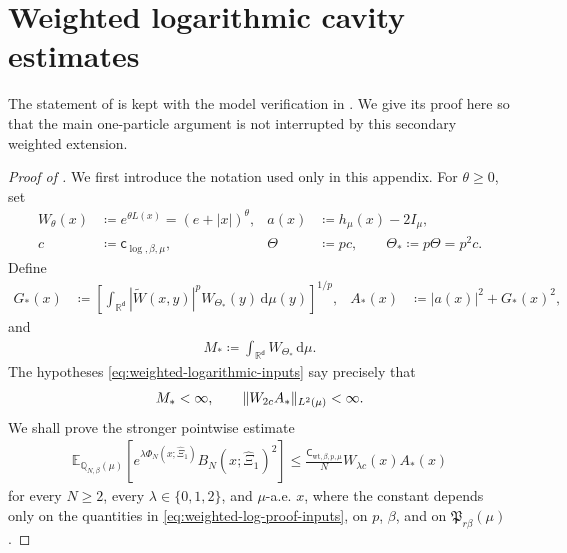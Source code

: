 \documentclass[11pt,reqno]{amsart}
\numberwithin{equation}{section}
\theoremstyle{plain}
\theoremstyle{remark}
\DeclarePairedDelimiter{\norm}{\lVert}{\rVert}
\renewcommand{\d}{\mathsf{d}}
\newcommand{\md}{\mathrm{d}}
\newcommand{\R}{{\mathbb{R}}}
\newcommand{\E}{{\mathbb{E}}}
\newcommand{\Q}{{\mathbb{Q}}}
\newcommand{\tl}{\widetilde}
\newcommand{\be}{\beta}
\begin{document}
\appendix
{}

\section{Weighted logarithmic cavity estimates}
\label{app:weighted-log-cavity}

The statement of  is kept with the model verification in .  We give its proof here so that the main one-particle argument is not interrupted by this secondary weighted extension.

\begin{proof}[Proof of ]
We first introduce the notation used only in this appendix.  For \(\theta\ge0\), set
\begin{align}\label{eq:weighted-log-proof-weights}
 W_\theta(x)&\coloneqq e^{\theta L(x)}=(e+|x|)^\theta,
 &
 a(x)&\coloneqq h_\mu(x)-2I_\mu,\\
 c&\coloneqq \mathsf c_{\log,\be,\mu},
 &
 \Theta&\coloneqq pc,
 \qquad
 \Theta_*\coloneqq p\Theta=p^2c.
\end{align}
Define
\begin{align}\label{eq:weighted-log-proof-GA}
 G_*(x)&\coloneqq
 \left[\int_{\R^\d}|\tl W(x,y)|^p W_{\Theta_*}(y)\,\md\mu(y)\right]^{1/p},
 &
 A_*(x)&\coloneqq |a(x)|^2+G_*(x)^2,
\end{align}
and
\begin{align}\label{eq:weighted-log-proof-M}
 M_*\coloneqq\int_{\R^\d}W_{\Theta_*}\,\md\mu.
\end{align}
The hypotheses \eqref{eq:weighted-logarithmic-inputs} say precisely that
\begin{align}\label{eq:weighted-log-proof-inputs}
 M_*<\infty,
 \qquad
 \norm{W_{2c}A_*}_{L^2(\mu)}<\infty.
\end{align}
We shall prove the stronger pointwise estimate
\begin{align}\label{eq:weighted-log-pointwise-B2}
 \E_{\Q_{N,\be}(\mu)}\left[
 e^{\lambda\Phi_N(x;\hat\Xi_1)}B_N(x;\hat\Xi_1)^2\right]
 \le
 \frac{\mathsf C_{\mathrm{wt},\be,p,\mu}}{N}
 W_{\lambda c}(x)A_*(x)
\end{align}
for every \(N\ge2\), every \(\lambda\in\{0,1,2\}\), and \(\mu\)-a.e. \(x\), where the constant depends only on the quantities in \eqref{eq:weighted-log-proof-inputs}, on \(p\), \(\be\), and on \(\mathfrak P_{r\be}(\mu)\).


\end{proof}
\end{document}
